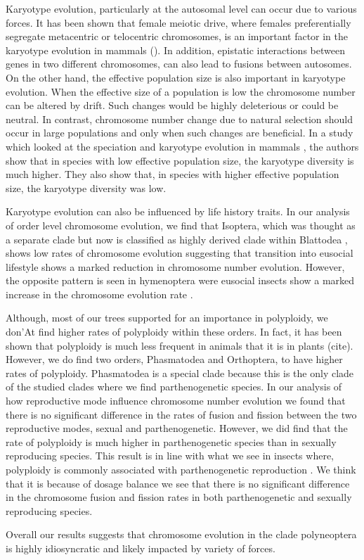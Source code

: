 Karyotype evolution, particularly at the autosomal level can occur due to various forces.
It has been shown that female meiotic drive, where females preferentially segregate metacentric or telocentric chromosomes, is an important factor in the karyotype evolution in mammals (\citep{de2001female, blackmon2019meiotic}).
In addition, epistatic interactions between genes in two different chromosomes, can also lead to fusions between autosomes. 
On the other hand, the effective population size is also important in karyotype evolution.
When the effective size of a population is low the chromosome number can be altered by drift. 
Such changes would be highly deleterious or could be neutral. 
In contrast, chromosome number change due to natural selection should occur in large populations and only when such changes are beneficial.
In a study which looked at the speciation and karyotype evolution in mammals \citep{bush1977rapid}, the authors show that in species with low effective population size, the karyotype diversity is much higher.
They also show that, in species with higher effective population size, the karyotype diversity was low.

Karyotype evolution can also be influenced by life history traits. 
In our analysis of order level chromosome evolution, we find that Isoptera, which was thought as a separate clade but now is classified as highly derived clade within Blattodea , shows low rates of chromosome evolution suggesting that transition into eusocial lifestyle shows a marked reduction in chromosome number evolution.
However, the opposite pattern is seen in hymenoptera were eusocial insects show a marked increase in the chromosome evolution rate \citep{ross2015}.

Although, most of our trees supported for an importance in polyploidy, we don'At find higher rates of polyploidy within these orders.
In fact, it has been shown that polyploidy is much less frequent in animals that it is in plants (cite).
However, we do find two orders, Phasmatodea and Orthoptera, to have higher rates of polyploidy.
Phasmatodea is a special clade because this is the only clade of the studied clades where we find parthenogenetic species. 
In our analysis of how reproductive mode influence chromosome number evolution we found that there is no significant difference in the rates of fusion and fission between the two reproductive modes, sexual and parthenogenetic. 
However, we did find that the rate of polyploidy is much higher in parthenogenetic species than in sexually reproducing species. 
This result is in line with what we see in insects where, polyploidy is commonly associated with parthenogenetic reproduction \citep{lokki1980polyploidy}.
We think that it is because of dosage balance we see that there is no significant difference in the chromosome fusion and fission rates in both parthenogenetic and sexually reproducing species. 

Overall our results suggests that chromosome evolution in the clade polyneoptera is highly idiosyncratic and likely impacted by variety of forces.